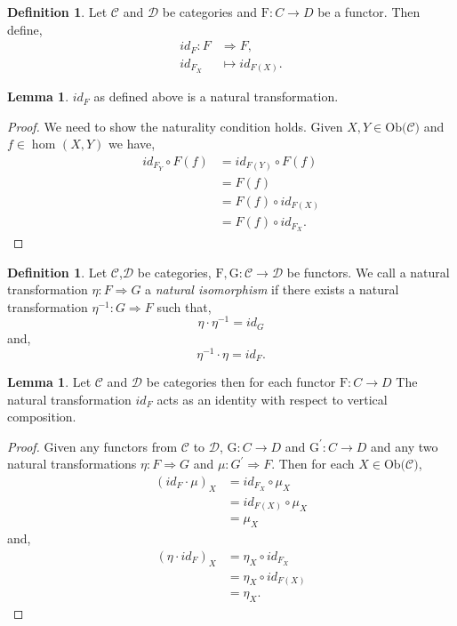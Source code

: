\documentclass[11pt,a4paper]{article}
\theoremstyle{definition}
\newtheorem{lemma}[thm]{Lemma}
\newtheorem{definition}[thm]{Definition}
\newcommand\ho[3][]{\hom_{#1}(#2,#3)}
\newcommand\ob[1]{\mathrm{Ob(}#1\mathrm{)}}
\newcommand\cat[1]{\mathscr{#1}}
\newcommand\func[3]{\mathrm{#1}\colon#2\rightarrow#3}
\newcommand\nattran[3]{#1\colon#2\Rightarrow#3}
\numberwithin{equation}{section}
\begin{document}
\begin{definition}
\label{def:identnattran}
Let $\cat{C}$ and $\cat{D}$ be categories and $\func{F}{C}{D}$ be a functor. Then define,
\begin{align*}
    \nattran{id_{F}}{F&}{F},\\
    id_{F_{X}}&\mapsto id_{F(X)}.
\end{align*}
\end{definition}
\begin{lemma}
\label{lem:identnattran}
$id_{F}$ as defined above is a natural transformation.
\end{lemma}
\begin{proof}
We need to show the naturality condition holds. Given $X,Y\in\ob{\cat{C}}$ and $f\in\ho{X}{Y}$ we have,
\begin{align*}
    id_{F_{Y}}\circ F(f) &= id_{F(Y)} \circ F(f)\\
    &= F(f)\\
    &= F(f)\circ id_{F(X)}\\
    &= F(f)\circ id_{F_X}.
\end{align*}
\end{proof}
\begin{definition}
    \label{def:naturaliso}
    Let $\cat{C}$,$\cat{D}$ be categories, $\func{F,G}{\cat{C}}{\cat{D}}$ be functors. We call a natural transformation $\nattran{\eta}{F}{G}$ a \emph{natural isomorphism} if there exists a natural transformation $\nattran{\eta^{-1}}{G}{F}$ such that,
    \[\eta\cdot\eta^{-1} = id_{G}\]
    and,
    \[\eta^{-1}\cdot\eta = id_{F}.\]
\end{definition}
\begin{lemma}
Let $\cat{C}$ and $\cat{D}$ be categories then for each functor $\func{F}{C}{D}$ The natural transformation $id_{F}$ acts as an identity with respect to vertical composition.
\end{lemma}
\begin{proof}
Given any functors from $\cat{C}$ to $\cat{D}$, $\func{G}{C}{D}$ and $\func{G^{\prime}}{C}{D}$ and any two natural transformations $\nattran{\eta}{F}{G}$ and $\nattran{\mu}{G^{\prime}}{F}$. Then for each $X\in\ob{\cat{C}}$,
\begin{align*}
    (id_{F}\cdot\mu)_{X}&=id_{F_X} \circ \mu_{X}\\
    &= id_{F(X)}\circ \mu_{X}\\
    &=\mu_{X}
\end{align*}
and,
\begin{align*}
    (\eta\cdot id_{F})_{X}&=\eta_{X} \circ id_{F_X}\\
    &= \eta_{X} \circ id_{F(X)}\\
    &= \eta_{X}.
\end{align*}
\end{proof}
\end{document}
